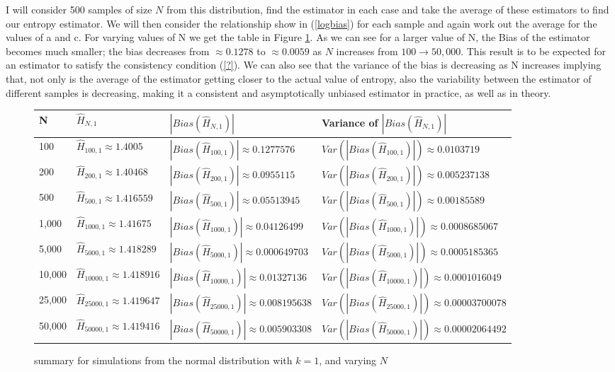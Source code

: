 \documentclass{article}
\begin{document}
I will consider 500 samples of size $N$ from this distribution, find the estimator in each case and take the average of these estimators to find our entropy estimator. We will then consider the relationship show in (\ref{logbias}) for each sample and again work out the average for the values of a and c. For varying values of N we get the table in Figure \ref{fig:normal_k=1}. As we can see for a larger value of N, the Bias of the estimator becomes much smaller; the bias decreases from $\approx 0.1278$ to $\approx 0.0059$ as $N$ increases from $100 \to 50,000$. This result is to be expected for an estimator to satisfy the consistency condition (\ref{?}). We can also see that the variance of the bias is decreasing as N increases implying that, not only is the average of the estimator getting closer to the actual value of entropy,  also the variability between the estimator of different samples is decreasing, making it a consistent and asymptotically unbiased estimator in practice, as well as in theory.

\begin{figure} 
 \begin{adjustwidth}{-2cm}{}
\begin{tabular}{|l|l|l|l|}
\hline
N & $\hat{H}_{N, 1}$ & $|Bias(\hat{H}_{N, 1})|$ & Variance of $|Bias(\hat{H}_{N, 1})|$ \\
\hline
100 & $\hat{H}_{100, 1} \approx 1.4005$ & $|Bias(\hat{H}_{100, 1})| \approx 0.1277576$ & $Var(|Bias(\hat{H}_{100, 1})|) \approx 0.0103719$\\
200 & $\hat{H}_{200, 1} \approx 1.40468$ & $|Bias(\hat{H}_{200, 1})| \approx 0.0955115$ & $Var(|Bias(\hat{H}_{200, 1})|) \approx 0.005237138$\\
500 & $\hat{H}_{500, 1} \approx 1.416559$ & $|Bias(\hat{H}_{500, 1})| \approx 0.05513945$ & $Var(|Bias(\hat{H}_{500, 1})|) \approx 0.00185589$\\
1,000 & $\hat{H}_{1000, 1} \approx 1.41675$ & $|Bias(\hat{H}_{1000, 1})| \approx 0.04126499$ & $Var(|Bias(\hat{H}_{1000, 1})|) \approx 0.0008685067$\\
5,000 & $\hat{H}_{5000, 1} \approx 1.418289$ & $|Bias(\hat{H}_{5000, 1})| \approx 0.000649703$ & $Var(|Bias(\hat{H}_{5000, 1})|) \approx 0.0005185365 $\\
10,000 & $\hat{H}_{10000, 1} \approx 1.418916$ & $|Bias(\hat{H}_{10000, 1})| \approx 0.01327136$ & $Var(|Bias(\hat{H}_{10000, 1})|) \approx 0.0001016049$\\
25,000 & $\hat{H}_{25000, 1} \approx 1.419647$ & $|Bias(\hat{H}_{25000, 1})| \approx 0.008195638$ & $Var(|Bias(\hat{H}_{25000, 1})|) \approx 0.00003700078$\\
50,000 & $\hat{H}_{50000, 1} \approx 1.419416$ & $|Bias(\hat{H}_{50000, 1})| \approx 0.005903308$ & $Var(|Bias(\hat{H}_{50000, 1})|) \approx 0.00002064492$\\
\hline
\end{tabular}
\caption{\label{fig:normal_k=1} summary for simulations from the normal distribution with $k=1$, and varying $N$}
 \end{adjustwidth}
\end{figure}
\end{document}
